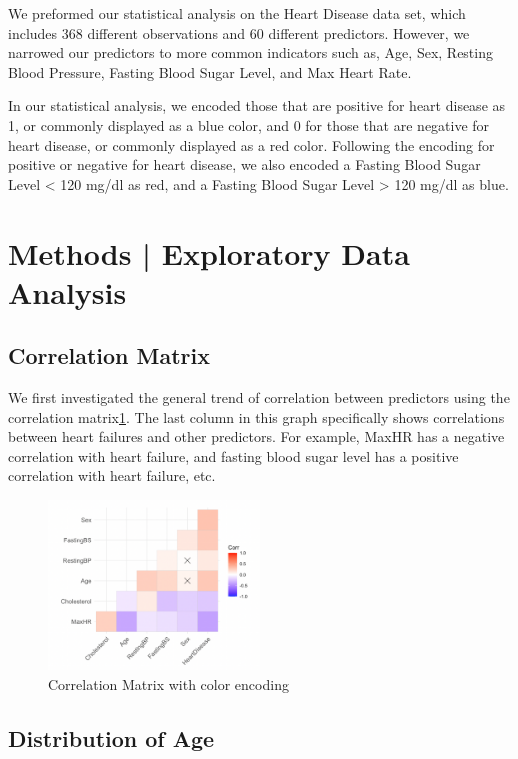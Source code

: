 \documentclass{article}
\begin{document}
We preformed our statistical analysis on the Heart Disease data set, which includes 368 different observations and 60 different predictors. However, we narrowed our predictors to more common indicators such as, Age, Sex, Resting Blood Pressure, Fasting Blood Sugar Level, and Max Heart Rate. 

In our statistical analysis, we encoded those that are positive for heart disease as 1, or commonly displayed as a blue color, and 0 for those that are negative for heart disease, or commonly displayed as a red color. 
Following the encoding for positive or negative for heart disease, we also encoded a Fasting Blood Sugar Level < 120 mg/dl as red, and a Fasting Blood Sugar Level > 120 mg/dl as blue.


\section{Methods | Exploratory Data Analysis}
\subsection{Correlation Matrix}
We first investigated the general trend of correlation between predictors using the correlation matrix\ref{fig1}. The last column in this graph specifically shows correlations between heart failures and other predictors. For example, MaxHR has a negative correlation with heart failure, and fasting blood sugar level has a positive correlation with heart failure, etc.

\begin{figure}[h]
	\centering
	\includegraphics[width=0.5\textwidth]{images/cor.PNG}
	\caption{Correlation Matrix with color encoding}
	\label{fig1}
\end{figure}

\subsection {Distribution of Age}
\end{document}
